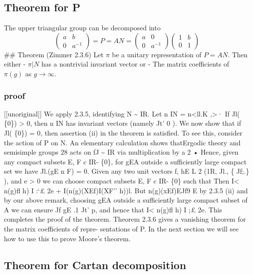 \documentclass[
]{article}
\begin{document}
\hypertarget{theorem-for-p}{%
\subsection{Theorem for P}\label{theorem-for-p}}

The upper triangular group can be decomposed into
\[\begin{pmatrix}a & b \\ 0 & a^{-1}\end{pmatrix} =
P = AN =
\begin{pmatrix}a & 0 \\ 0 & a^{-1}\end{pmatrix} \begin{pmatrix}1 & b \\ 0 & 1\end{pmatrix}\]
\#\# Theorem (Zimmer 2.3.6) Let \(\pi\) be a unitary representation of
\(P = AN\). Then either - \(\pi|N\) has a nontrivial invariant vector or
- The matrix coefficients of \(\pi(g)\) as \(g \rightarrow \infty\).

\hypertarget{proof}{%
\subsubsection{proof}\label{proof}}

{[}{[}unoriginal{]}{]} We apply 2.3.5, identifying N \textasciitilde{}
IR. Let n IN = n\textless ll.K ,\textgreater· If Jl( \{0\})
\textgreater{} 0, then n IN has invariant vectors (namely Jt' 0 ). We
now show that if Jl( \{0\}) = 0, then assertion (ii) in the theorem is
satisfied. To see this, consider the action of P on N. An elementary
calculation shows thatErgodic theory and semisimple groups 28 acts on fJ
\textasciitilde{} IR via multiplication by a 2 • Hence, given any
compact subsets E, F c IR- \{0\}, for gEA outside a sufficiently large
compact set we have Jl.(gE n F) = 0. Given any two unit vectors f, hE L
2 (1R, Jl., \{ Jf;.\} ), and e \textgreater{} 0 we can choose compact
subsets E, F c IR- \{0\} such that Then I\textless{} n(g)fl h) I :`£ 2e
+ I(n(g)(XEf)I(XF'' h))l. But n(g)(xEf)EJf9 E by 2.3.5 (ii) and by our
above remark, choosing gEA outside a sufficiently large compact subset
of A we can ensure Jf gE .1 Jt' p, and hence that I\textless{} n(g)fl h)
I ;£ 2e. This completes the proof of the theorem. Theorem 2.3.6 gives a
vanishing theorem for the matrix coefficients of repre- sentations of P.
In the next section we will see how to use this to prove Moore's
theorem.

\hypertarget{theorem-for-cartan-decomposition}{%
\subsection{Theorem for Cartan
decomposition}\label{theorem-for-cartan-decomposition}}
\end{document}
